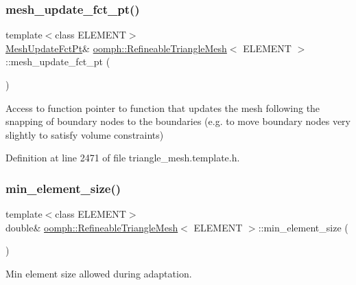 \subsubsection{\texorpdfstring{mesh\+\_\+update\+\_\+fct\+\_\+pt()}{mesh\_update\_fct\_pt()}}
{\footnotesize\ttfamily template$<$class E\+L\+E\+M\+E\+NT$>$ \\
\hyperlink{classoomph_1_1RefineableTriangleMesh_aa78ffa56b66a1371aec25e25f7aaff9e}{Mesh\+Update\+Fct\+Pt}\& \hyperlink{classoomph_1_1RefineableTriangleMesh}{oomph\+::\+Refineable\+Triangle\+Mesh}$<$ E\+L\+E\+M\+E\+NT $>$\+::mesh\+\_\+update\+\_\+fct\+\_\+pt (\begin{DoxyParamCaption}{ }\end{DoxyParamCaption})\hspace{0.3cm}{\ttfamily [inline]}}



Access to function pointer to function that updates the mesh following the snapping of boundary nodes to the boundaries (e.\+g. to move boundary nodes very slightly to satisfy volume constraints) 



Definition at line 2471 of file triangle\+\_\+mesh.\+template.\+h.

\mbox{\label{classoomph_1_1RefineableTriangleMesh_ad25cf23f688c1007b5fbbe41d2ec6cfc}} 
\subsubsection{\texorpdfstring{min\+\_\+element\+\_\+size()}{min\_element\_size()}}
{\footnotesize\ttfamily template$<$class E\+L\+E\+M\+E\+NT$>$ \\
double\& \hyperlink{classoomph_1_1RefineableTriangleMesh}{oomph\+::\+Refineable\+Triangle\+Mesh}$<$ E\+L\+E\+M\+E\+NT $>$\+::min\+\_\+element\+\_\+size (\begin{DoxyParamCaption}{ }\end{DoxyParamCaption})\hspace{0.3cm}{\ttfamily [inline]}}



Min element size allowed during adaptation. 



